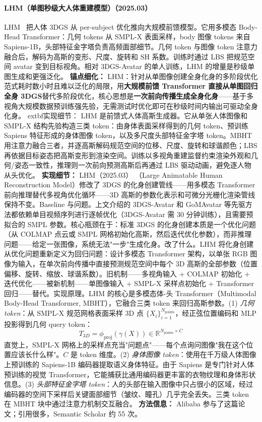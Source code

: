 \paragraph{LHM（单图秒级大人体重建模型）（2025.03）}
LHM~\cite{2503_10625} 把人体 3DGS 从 per-subject 优化推向大规模前馈模型。它用多模态 Body-Head Transformer：几何 tokens 从 SMPL-X 表面采样，body 图像 tokens 来自 Sapiens-1B，头部特征金字塔负责高频面部细节。几何 token 与图像 token 注意力融合后，解码为高斯的变形、尺度、旋转和 SH 系数。训练时通过 LBS 把规范空间 avatar 变到目标视角。相对 3DGS-Avatar 的单人训练，LHM 的增量是秒级单图生成和更强泛化。
\textbf{锚点细化：} LHM：针对从单图像创建全身化身的多阶段优化范式耗时数小时且难以泛化的局限，用\textbf{大规模前馈 Transformer 直接从单图回归全身 3DGS}替代多阶段优化，核心思想是\textbf{一次前向传播生成全身化身}——基于多视角大规模数据预训练强先验，无需测试时优化即可在秒级时间内输出可驱动全身化身。
	extbf{实现细节：} LHM 是前馈式人体高斯生成器。它从单张人体图像和 SMPL-X 结构先验构造三类 token：由身体表面采样得到的几何 token、预训练 Sapiens 特征形成的身体图像 token，以及多尺度头部特征金字塔 token。MBHT 用注意力融合三者，并逐高斯解码规范空间的位移、尺度、旋转和球谐颜色；LBS 再依据目标姿态把高斯变形到渲染空间。训练以多视角重建监督约束渲染外观和几何/姿态一致性，推理则一次前向预测高斯后再通过 LBS 驱动动画，避免逐人物从头优化。
\textbf{实现细节：} LHM（2025.03） （Large Animatable Human Reconstruction Model）修改了 3DGS 的化身创建管线——用多模态 Transformer 前向推理替代多视角优化循环——3D 高斯的参数化表示和可微分光栅化渲染管线保持不变。Baseline 与问题。上文介绍的 3DGS-Avatar 和 GoMAvatar 等先驱方法都依赖单目视频序列进行逐帧优化（3DGS-Avatar 需 30 分钟训练），且需要预拟合的 SMPL 参数。核心瓶颈在于：标准 3DGS 的化身创建本质是一个优化问题（从 COLMAP 点云或 SMPL 网格初始化高斯，然后迭代优化参数），而非推理问题——给定一张图像，系统无法"一步"生成化身。改了什么。LHM 将化身创建从优化问题重新定义为回归问题：设计多模态 Transformer 架构，以单张 RGB 图像为输入，在单次前向传播中直接预测规范空间中每个 3D 高斯的全部参数（位置偏移、旋转、缩放、球谐系数）。旧机制——多视角输入 + COLMAP 初始化 + 迭代优化——被新机制——单图像输入 + SMPL-X 采样点初始化 + Transformer 回归——替代。实现原理。LHM 的核心是多模态体-头 Transformer（Multimodal Body-Head Transformer, MBHT），它融合三类 token 来回归高斯参数。(1) \textit{几何 token}：从 SMPL-X 规范网格表面采样 3D 点 $\{X_i\}_{i=1}^{N_{\mathrm{points}}}$，经正弦位置编码和 MLP 投影得到几何 query token： \[ T_{3D} = \phi_{\text{proj}}(\gamma(X)) \in \mathbb{R}^{N_{\text{points}} \times C} \] 直觉上，SMPL-X 网格上的采样点充当"问题点"——每个点询问图像"我在这个位置应该长什么样"。$C$ 是 token 维度。(2) \textit{身体图像 token}：使用在千万级人体图像上预训练的 Sapiens-1B 编码器提取语义身体特征。由于 Sapiens 是专门针对人体预训练的视觉 Transformer，它能捕获比通用编码器更丰富的衣物纹理和身体形状信息。(3) \textit{头部特征金字塔 token}：人的头部在输入图像中只占很小的区域，经过编码器的空间下采样后关键面部细节（皱纹、瞳孔）几乎完全丢失。三类 token 在 MBHT 块中通过注意力机制交互融合。
\textbf{方法信息：} Alibaba 参与了这篇论文；引用很多，Semantic Scholar 约 55 次。



